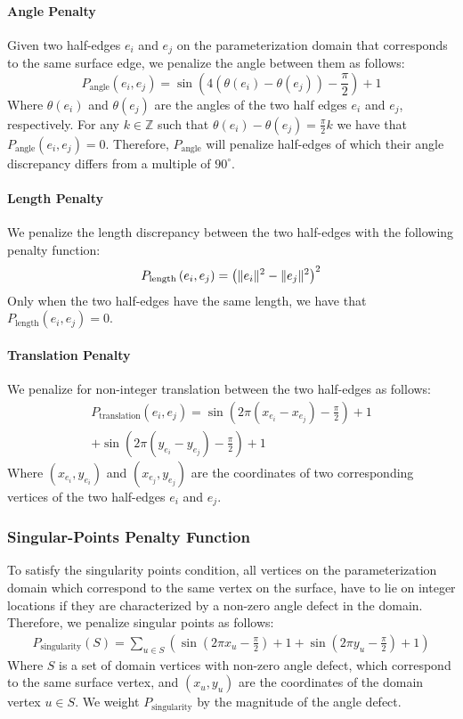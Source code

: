 \paragraph{Angle Penalty}
Given two half-edges $e_i$ and $e_j$ on the parameterization domain that corresponds to the same surface edge, we penalize the angle between them as follows: 
$$P_{\mathrm{angle}}\left(e_i,e_j\right) = \sin\left(4\left(\theta(e_i) - \theta(e_j) \right) - \frac{\pi}{2} \right) + 1$$
Where $\theta(e_i)$ and $\theta(e_j)$ are the angles of the two half edges $e_i$ and $e_j$, respectively. For any $k \in \mathbb{Z}$ such that $\theta(e_i) - \theta(e_j) = \frac{\pi}{2}k$ we have that $P_{\mathrm{angle}}\left(e_i,e_j\right) = 0$. Therefore, $P_{\mathrm{angle}}$ will penalize half-edges of which their angle discrepancy differs from a multiple of $90^\circ$.
\paragraph{Length Penalty}
We penalize the length discrepancy between the two half-edges with the following penalty function:
$$P_{\mathrm{length}}\left(e_i,e_j\right) = \left( \lVert e_i\rVert^2 - \lVert e_j\rVert^2 \right)^2$$
Only when the two half-edges have the same length, we have that $P_{\mathrm{length}}\left(e_i,e_j\right) = 0$.
\paragraph{Translation Penalty}
We penalize for non-integer translation between the two half-edges as follows:
\begin{multline}
P_{\mathrm{translation}}\left(e_i,e_j\right) = \sin\left(2\pi\left(x_{e_i} - x_{e_j}\right) - \frac{\pi}{2} \right) + 1 \\ + \sin\left(2\pi\left(y_{e_i} - y_{e_j}\right) - \frac{\pi}{2} \right) + 1 \nonumber
\end{multline}
Where $\left(x_{e_i}, y_{e_i}\right)$ and $\left(x_{e_j}, y_{e_j}\right)$ are the coordinates of two corresponding vertices of the two half-edges $e_i$ and $e_j$.
\subsubsection{Singular-Points Penalty Function}
To satisfy the singularity points condition, all vertices on the parameterization domain which correspond to the same vertex on the surface, have to lie on integer locations if they are characterized by a non-zero angle defect in the domain. Therefore, we penalize singular points as follows:
\begin{multline}
P_{\mathrm{singularity}}\left(S\right) = \sum_{u \in S} \left( \sin\left(2 \pi x_{u} - \frac{\pi}{2} \right) + 1 + \sin\left(2 \pi y_{u} - \frac{\pi}{2} \right) + 1 \right) \nonumber
\end{multline}
Where $S$ is a set of domain vertices with non-zero angle defect, which correspond to the same surface vertex, and $\left(x_u,y_u\right)$ are the coordinates of the domain vertex $u \in S$. We weight $P_{\mathrm{singularity}}$ by the magnitude of the angle defect.
